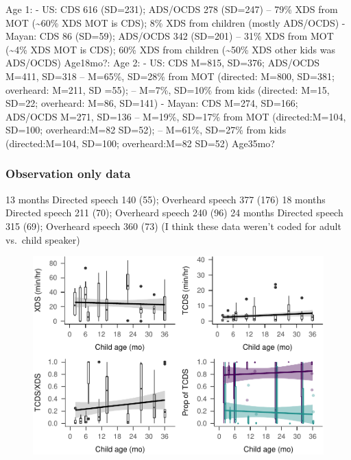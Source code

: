 \documentclass[man]{apa6}
\theoremstyle{definition}
\theoremstyle{definition}
\theoremstyle{definition}
\theoremstyle{remark}
\begin{document}
Age 1: - US: CDS 616 (SD=231); ADS/OCDS 278 (SD=247) -- 79\% XDS from
MOT (\textasciitilde{}60\% XDS MOT is CDS); 8\% XDS from children
(mostly ADS/OCDS) - Mayan: CDS 86 (SD=59); ADS/OCDS 342 (SD=201) -- 31\%
XDS from MOT (\textasciitilde{}4\% XDS MOT is CDS); 60\% XDS from
children (\textasciitilde{}50\% XDS other kids was ADS/OCDS) Age18mo?:
Age 2: - US: CDS M=815, SD=376; ADS/OCDS M=411, SD=318 -- M=65\%,
SD=28\% from MOT (directed: M=800, SD=381; overheard: M=211, SD =55); --
M=7\%, SD=10\% from kids (directed: M=15, SD=22; overheard: M=86,
SD=141) - Mayan: CDS M=274, SD=166; ADS/OCDS M=271, SD=136 -- M=19\%,
SD=17\% from MOT (directed:M=104, SD=100; overheard:M=82 SD=52); --
M=61\%, SD=27\% from kids (directed:M=104, SD=100; overheard:M=82 SD=52)
Age35mo?

\subsubsection{Observation only data}\label{observation-only-data}

13 months Directed speech 140 (55); Overheard speech 377 (176) 18 months
Directed speech 211 (70); Overheard speech 240 (96) 24 months Directed
speech 315 (69); Overheard speech 360 (73) (I think these data weren't
coded for adult vs.~child speaker)

\begin{figure}
\centering
\includegraphics{Tseltal-CLE_files/figure-latex/plot_XDS_TDS_quantity_random-1.pdf}
\caption{}
\end{figure}
\end{document}
